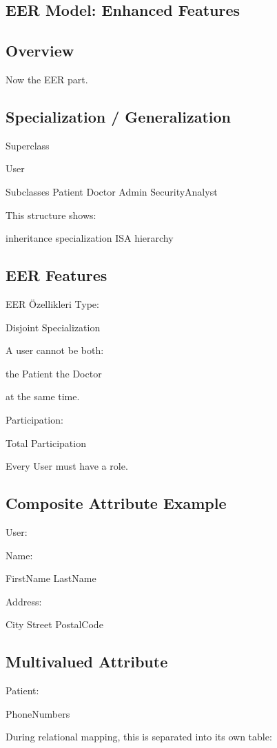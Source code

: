 \subsection*{EER Model: Enhanced Features}

\subsection*{Overview}
Now the EER part.

\subsection*{Specialization / Generalization}
Superclass

User

Subclasses
Patient
Doctor
Admin
SecurityAnalyst

This structure shows:

inheritance
specialization
ISA hierarchy

\subsection*{EER Features}

EER Özellikleri
Type:

Disjoint Specialization

A user cannot be both:

the Patient
the Doctor

at the same time.

Participation:

Total Participation

Every User must have a role.

\subsection*{Composite Attribute Example}

User:

Name:

FirstName
LastName

Address:

City
Street
PostalCode
\subsection*{Multivalued Attribute}

Patient:

PhoneNumbers

During relational mapping, this is separated into its own table:

